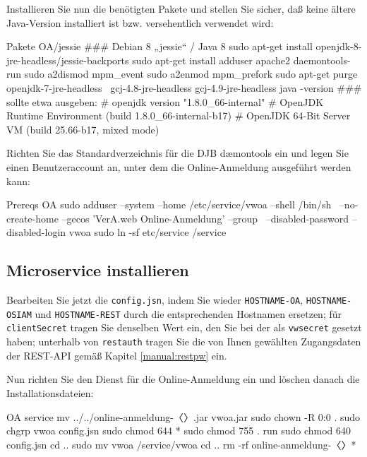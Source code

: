 \begin{minipage}{\linewidth}
Installieren Sie nun die benötigten Pakete und stellen Sie sicher, daß keine
ältere Java-Version installiert ist bzw. versehentlich verwendet wird:

\begin{lstdump}{Pakete OA/jessie}
### Debian 8 „jessie“ / Java 8
sudo apt-get install openjdk-8-jre-headless/jessie-backports
sudo apt-get install adduser apache2 daemontools-run
sudo a2dismod mpm_event
sudo a2enmod mpm_prefork
sudo apt-get purge openjdk-7-jre-headless \
    gcj-4.8-jre-headless gcj-4.9-jre-headless
java -version
### sollte etwa ausgeben:
# openjdk version "1.8.0_66-internal"
# OpenJDK Runtime Environment (build 1.8.0_66-internal-b17)
# OpenJDK 64-Bit Server VM (build 25.66-b17, mixed mode)
\end{lstdump}
\end{minipage}

\begin{minipage}{\linewidth}
Richten Sie das Standardverzeichnis für die DJB dæmontools
ein und legen Sie einen Benutzeraccount an, unter dem die
Online-Anmeldung ausgeführt werden kann:

\begin{lstdump}{Prereqs OA}
sudo adduser --system --home /etc/service/vwoa --shell /bin/sh \
    --no-create-home --gecos 'VerA.web Online-Anmeldung' --group \
    --disabled-password --disabled-login vwoa
sudo ln -sf etc/service /service
\end{lstdump}
\end{minipage}

\subsection{Microservice installieren}\label{subsec:setup-oa-svc}

Bearbeiten Sie jetzt die \texttt{config.jsn}, indem Sie wieder
\texttt{HOSTNAME-OA},
\texttt{HOSTNAME-OSIAM} und \texttt{HOSTNAME-REST} durch die
entsprechenden Hostnamen ersetzen; für \texttt{clientSecret}
tragen Sie denselben Wert ein, den Sie bei der
\nameref{subsec:setup-osiam-register} als \texttt{vwsecret}
gesetzt haben; unterhalb von \texttt{restauth} tragen Sie die
von Ihnen gewählten Zugangsdaten der REST-API gemäß Kapitel
\ref{manual:restpw} ein.

\begin{minipage}{\linewidth}
Nun richten Sie den Dienst für die Online-Anmeldung ein und
löschen danach die Installationsdateien:

\begin{lstdump}{OA service}
mv ../../online-anmeldung-〈\lstdumpesc{\vwiaverssw}〉.jar vwoa.jar
sudo chown -R 0:0 .
sudo chgrp vwoa config.jsn
sudo chmod 644 *
sudo chmod 755 . run
sudo chmod 640 config.jsn
cd ..
sudo mv vwoa /service/vwoa
cd ..
rm -rf online-anmeldung-〈\lstdumpesc{\vwiaverssw}〉*
\end{lstdump}
\end{minipage}

